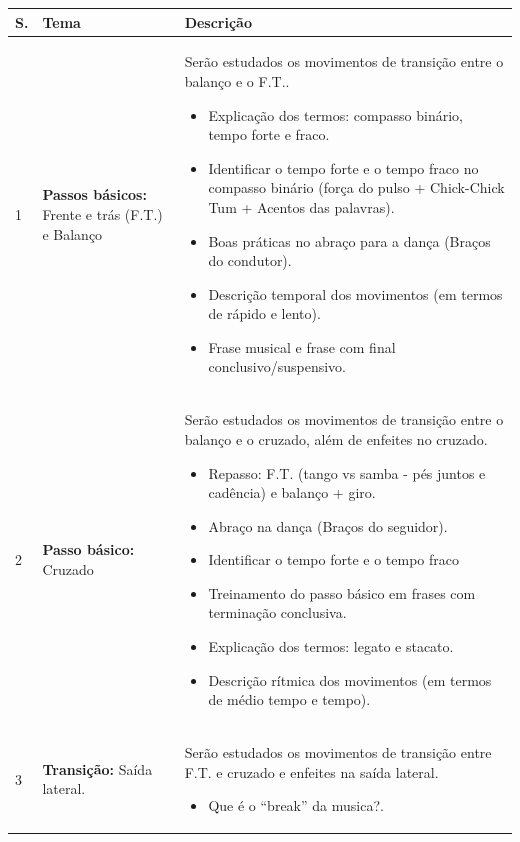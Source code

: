\documentclass[12pt, a4paper]{article}
\begin{document}
\newpage
\begin{longtable}{|p{0.5cm}|p{3.0cm}|p{12.0cm}|}
\hline
S. & Tema & Descrição \\  \hline \hline
1 &  \textbf{Passos básicos:} Frente e trás (F.T.) e Balanço & Serão estudados os movimentos de transição entre o balanço e o F.T.. 
        \begin{itemize}
        \item Explicação dos termos: compasso binário, tempo forte e fraco.
        \item Identificar o tempo forte e o tempo fraco no compasso binário (força do pulso + Chick-Chick Tum + Acentos das palavras).
        \item Boas práticas no abraço para a dança (Braços do condutor). 
        \item Descrição temporal dos movimentos (em termos de rápido e lento).
        \item Frase musical e frase com final conclusivo/suspensivo.
        \end{itemize}
        \\ \hline
2 &  \textbf{Passo básico:} Cruzado &  Serão estudados os movimentos de transição entre o balanço e o cruzado, além de enfeites no cruzado. 
        \begin{itemize}
        \item Repasso: F.T. (tango vs samba - pés juntos e cadência) e balanço + giro. 
        \item Abraço na dança (Braços do seguidor).
        \item Identificar o tempo forte e o tempo fraco
        \item Treinamento do passo básico em frases com terminação conclusiva. 
        \item Explicação dos termos: legato e stacato.
        \item Descrição rítmica dos movimentos (em termos de médio tempo e tempo).
        \end{itemize}
        \\ \hline
3 &  \textbf{Transição:} Saída lateral. &  Serão estudados os movimentos de transição entre F.T. e cruzado e enfeites na saída lateral. 
        \begin{itemize}
        \item Que é o ``break'' da musica?.

\end{itemize}
\end{longtable}
\end{document}
